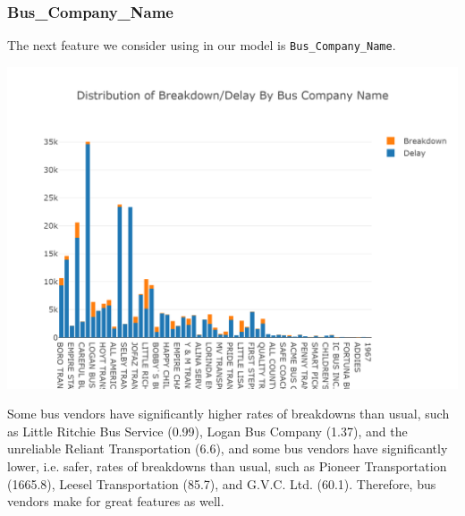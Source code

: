 \documentclass[11pt]{article}
\begin{document}
\subsubsection{Bus\_Company\_Name}
The next feature we consider using in our model is \texttt{Bus\_Company\_Name}.
\begin{center}
\includegraphics[width=5.25in]{images/bus_company_name_stacked.png}
\end{center}
Some bus vendors have significantly higher rates of breakdowns than usual, such as Little Ritchie Bus Service (0.99), Logan Bus Company (1.37), and the unreliable Reliant Transportation (6.6), and some bus vendors have significantly lower, i.e. safer, rates of breakdowns than usual, such as Pioneer Transportation (1665.8), Leesel Transportation (85.7), and G.V.C. Ltd. (60.1). Therefore, bus vendors make for great features as well.
\end{document}
